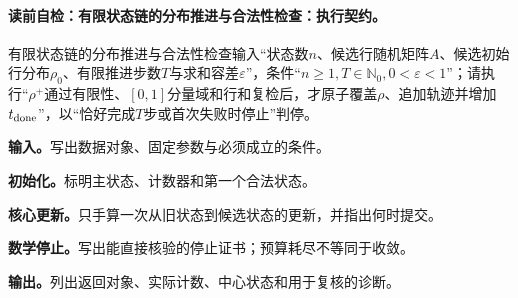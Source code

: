 \begingroup
{}
\paragraph{读前自检：有限状态链的分布推进与合法性检查：执行契约。}有限状态链的分布推进与合法性检查输入“状态数$n$、候选行随机矩阵$A$、候选初始行分布$\rho_0$、有限推进步数$T$与求和容差$\varepsilon$”，条件“$n\ge1,T\in\mathbb N_0,0<\varepsilon<1$”；请执行“$\rho^+$通过有限性、$[0,1]$分量域和行和复检后，才原子覆盖$\rho$、追加轨迹并增加$t_{\rm done}$”，以“恰好完成$T$步或首次失败时停止”判停。\par
\begin{keypointbox}[title={有限状态链的分布推进与合法性检查：五步阅读}]
\textbf{输入。}写出数据对象、固定参数与必须成立的条件。\par
\textbf{初始化。}标明主状态、计数器和第一个合法状态。\par
\textbf{核心更新。}只手算一次从旧状态到候选状态的更新，并指出何时提交。\par
\textbf{数学停止。}写出能直接核验的停止证书；预算耗尽不等同于收敛。\par
\textbf{输出。}列出返回对象、实际计数、中心状态和用于复核的诊断。
\end{keypointbox}

